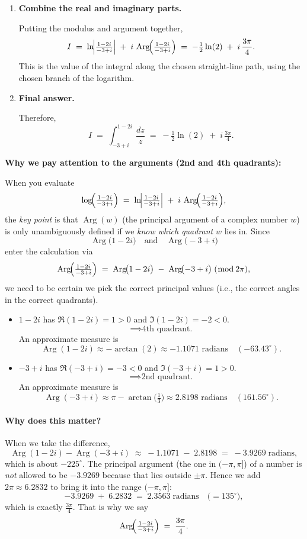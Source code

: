 \documentclass[12pt]{article}
\DeclareMathOperator{\Arg}{Arg}
\theoremstyle{definition} %
\theoremstyle{plain} %
\begin{document}
\begin{enumerate}
\item \textbf{Combine the real and imaginary parts.}

Putting the modulus and argument together,
\[
I
\;=\;
\ln\!\Bigl|\tfrac{1-2i}{-3+i}\Bigr|
\;+\;
i\,\Arg\!\Bigl(\tfrac{1-2i}{-3+i}\Bigr)
\;=\;
-\tfrac{1}{2}\ln(2)
\;+\;
i\,\frac{3\pi}{4}.
\]
This is the value of the integral along the chosen straight-line path, using the chosen branch of the logarithm.

\item \textbf{Final answer.}

Therefore,
\[
\boxed{
I \;=\; \int_{-3 + i}^{1 - 2i} \frac{dz}{z}
\;=\;
-\tfrac{1}{2}\ln(2)
\;+\;
i\,\tfrac{3\pi}{4}.
}
\]

\end{enumerate}
\textbf{Why we pay attention to the arguments (2nd and 4th quadrants):}

When you evaluate
\[
\log\!\Bigl(\tfrac{1-2i}{-3+i}\Bigr)
\;=\;
\ln\!\Bigl|\tfrac{1-2i}{-3+i}\Bigr|
\;+\;
i\,\Arg\!\Bigl(\tfrac{1-2i}{-3+i}\Bigr),
\]
the \emph{key point} is that $\Arg(w)$ (the principal argument of a complex number $w$) is only unambiguously defined if we \emph{know which quadrant} $w$ lies in.  Since
\[
\Arg\bigl(1-2i\bigr)\quad\text{and}\quad \Arg\bigl(-3+i\bigr)
\]
enter the calculation via
\[
\Arg\!\Bigl(\tfrac{1-2i}{-3+i}\Bigr)
\;=\;
\Arg\!\bigl(1-2i\bigr)\;-\;\Arg\!\bigl(-3+i\bigr)
\;(\bmod\,2\pi),
\]
we need to be certain we pick the correct principal values (i.e., the correct angles in the correct quadrants).

\begin{itemize}
\item $1-2i$ has \(\Re(1-2i) = 1 > 0\) and \(\Im(1-2i) = -2 < 0\). 
  \[
  \implies \text{4th quadrant.}
  \]
  An approximate measure is
  \[
  \Arg(1-2i) \approx -\arctan(2) \approx -1.1071 \text{ radians} \quad(-63.43^\circ).
  \]
  
\item $-3 + i$ has \(\Re(-3+i) = -3 < 0\) and \(\Im(-3+i) = 1 > 0\).
  \[
  \implies \text{2nd quadrant.}
  \]
  An approximate measure is
  \[
  \Arg(-3 + i) \approx \pi - \arctan\!\bigl(\tfrac{1}{3}\bigr) \approx 2.8198 \text{ radians} \quad(161.56^\circ).
  \]

\end{itemize}

\paragraph{Why does this matter?}
When we take the difference,
\[
\Arg(1-2i) - \Arg(-3+i) \;\approx\; -1.1071 \;-\; 2.8198 \;=\; -3.9269 \;\text{radians},
\]
which is about \(-225^\circ\).  The principal argument (the one in \((-\pi,\pi]\)) of a number is \emph{not} allowed to be \(-3.9269\) because that lies outside \(\pm \pi\).  Hence we add \(2\pi\approx 6.2832\) to bring it into the range \((-\pi,\pi]\):
\[
-3.9269 \;+\; 6.2832 \;=\; 2.3563 \;\text{radians} \quad\bigl(=135^\circ\bigr),
\]
which is exactly \(\frac{3\pi}{4}\).  That is why we say
\[
\Arg\!\Bigl(\tfrac{1-2i}{-3+i}\Bigr)
\;=\;
\frac{3\pi}{4}.
\]
\end{document}
